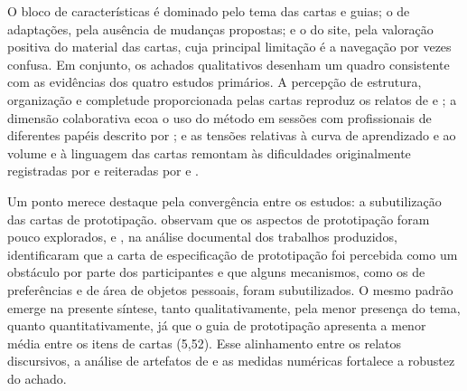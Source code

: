 \FloatBarrier

O bloco de características é dominado pelo tema das cartas e guias; o de adaptações, pela ausência de mudanças propostas; e o do site, pela valoração positiva do material das cartas, cuja principal limitação é a navegação por vezes confusa. Em conjunto, os achados qualitativos desenham um quadro consistente com as evidências dos quatro estudos primários. A percepção de estrutura, organização e completude proporcionada pelas cartas reproduz os relatos de  e ; a dimensão colaborativa ecoa o uso do método em sessões com profissionais de diferentes papéis descrito por ; e as tensões relativas à curva de aprendizado e ao volume e à linguagem das cartas remontam às dificuldades originalmente registradas por  e reiteradas por  e .

Um ponto merece destaque pela convergência entre os estudos: a subutilização das cartas de prototipação.  observam que os aspectos de prototipação foram pouco explorados, e , na análise documental dos trabalhos produzidos, identificaram que a carta de especificação de prototipação foi percebida como um obstáculo por parte dos participantes e que alguns mecanismos, como os de preferências e de área de objetos pessoais, foram subutilizados. O mesmo padrão emerge na presente síntese, tanto qualitativamente, pela menor presença do tema, quanto quantitativamente, já que o guia de prototipação apresenta a menor média entre os itens de cartas (5,52). Esse alinhamento entre os relatos discursivos, a análise de artefatos de  e as medidas numéricas fortalece a robustez do achado.

\begin{table}[h!]
\centering
\captionsetup{width=15cm}
\caption{Síntese qualitativa por bloco}
\label{tab:qual-sintese}
\end{table}


